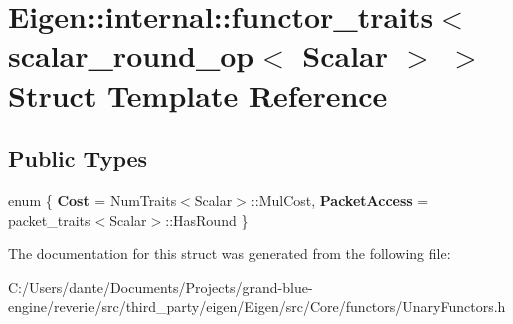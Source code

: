 \hypertarget{struct_eigen_1_1internal_1_1functor__traits_3_01scalar__round__op_3_01_scalar_01_4_01_4}{}\section{Eigen\+::internal\+::functor\+\_\+traits$<$ scalar\+\_\+round\+\_\+op$<$ Scalar $>$ $>$ Struct Template Reference}
\label{struct_eigen_1_1internal_1_1functor__traits_3_01scalar__round__op_3_01_scalar_01_4_01_4}
\subsection*{Public Types}
\begin{DoxyCompactItemize}
\item 
\mbox{\label{struct_eigen_1_1internal_1_1functor__traits_3_01scalar__round__op_3_01_scalar_01_4_01_4_a6ce9b35939356b892b5ab3a6f62e0d3c}} 
enum \{ {\bfseries Cost} = Num\+Traits$<$Scalar$>$\+::Mul\+Cost, 
{\bfseries Packet\+Access} = packet\+\_\+traits$<$Scalar$>$\+::Has\+Round
 \}
\end{DoxyCompactItemize}


The documentation for this struct was generated from the following file\+:\begin{DoxyCompactItemize}
\item 
C\+:/\+Users/dante/\+Documents/\+Projects/grand-\/blue-\/engine/reverie/src/third\+\_\+party/eigen/\+Eigen/src/\+Core/functors/Unary\+Functors.\+h\end{DoxyCompactItemize}
